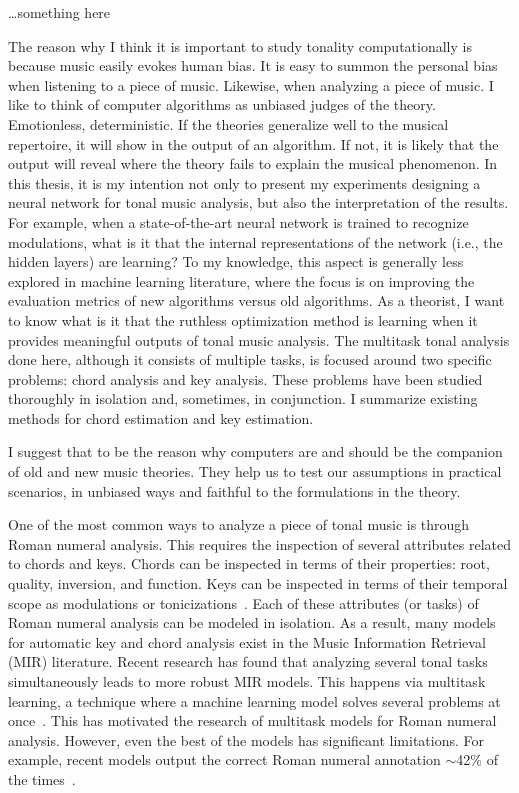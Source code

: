 \dots something here

The reason why I think it is important to study tonality
computationally is because music easily evokes human bias.
It is easy to summon the personal bias when listening to a
piece of music. Likewise, when analyzing a piece of music. I
like to think of computer algorithms as unbiased judges of
the theory. Emotionless, deterministic. If the theories
generalize well to the musical repertoire, it will show in
the output of an algorithm. If not, it is likely that the
output will reveal where the theory fails to explain the
musical phenomenon. In this thesis, it is my intention not
only to present my experiments designing a neural network
for tonal music analysis, but also the interpretation of the
results. For example, when a state-of-the-art neural network
is trained to recognize modulations, what is it that the
internal representations of the network (i.e., the hidden
layers) are learning? To my knowledge, this aspect is
generally less explored in machine learning literature,
where the focus is on improving the evaluation metrics of
new algorithms versus old algorithms. As a theorist, I want
to know what is it that the ruthless optimization method is
learning when it provides meaningful outputs of tonal music
analysis. The multitask tonal analysis done here, although
it consists of multiple tasks, is focused around two
specific problems: chord analysis and key analysis. These
problems have been studied thoroughly in isolation and,
sometimes, in conjunction. I summarize existing methods for
chord estimation and key estimation.


I suggest that to be the reason why computers are and should
be the companion of old and new music theories. They help us
to test our assumptions in practical scenarios, in unbiased
ways and faithful to the formulations in the theory.

One of the most common ways to analyze a piece of tonal
music is through Roman numeral analysis. This requires the
inspection of several attributes related to chords and keys.
Chords can be inspected in terms of their properties: root,
quality, inversion, and function. Keys can be inspected in
terms of their temporal scope as modulations or
tonicizations~\parencite{napoles_lopez2020local}. Each of
these attributes (or tasks) of Roman numeral analysis can be
modeled in isolation. As a result, many models for automatic
key and chord analysis exist in the Music Information
Retrieval (MIR) literature. Recent research has found that
analyzing several tonal tasks simultaneously leads to more
robust MIR models. This happens via multitask learning, a
technique where a machine learning model solves several
problems at once~\parencite{ruder2017overview}. This has
motivated the research of multitask models for Roman numeral
analysis. However, even the best of the models has
significant limitations. For example, recent models output
the correct Roman numeral annotation $\sim$42\% of the
times~\parencite{chen2021attend, micchi2020not}.

